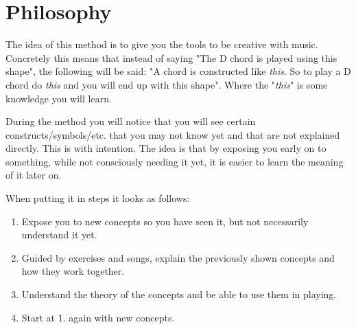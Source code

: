 \chapter{Philosophy}

The idea of this method is to give you the tools to be creative with music. Concretely this means that instead of saying "The D chord is played using this shape", the following will be said: "A chord is constructed like \textit{this}. So to play a D chord do \textit{this} and you will end up with this shape". Where the "\textit{this}" is some knowledge you will learn.

During the method you will notice that you will see certain constructs/symbols/etc. that you may not know yet and that are not explained directly. This is with intention. The idea is that by exposing you early on to something, while not consciously needing it yet, it is easier to learn the meaning of it later on.

When putting it in steps it looks as follows:

\begin{enumerate}
	\item Expose you to new concepts so you have seen it, but not necessarily understand it yet.
	\item Guided by exercises and songs, explain the previously shown concepts and how they work together.
	\item Understand the theory of the concepts and be able to use them in playing.
	\item Start at 1. again with new concepts.
\end{enumerate}